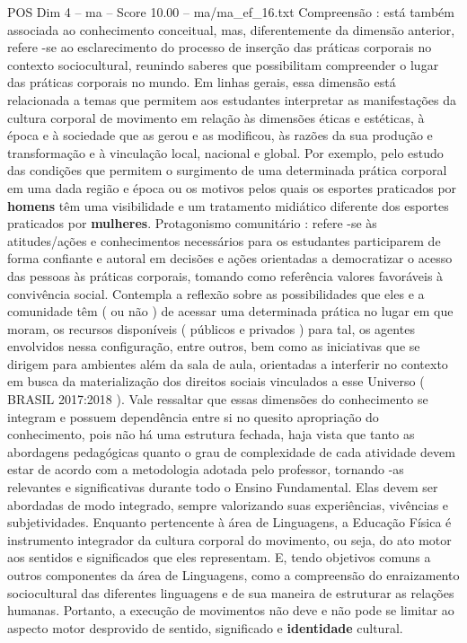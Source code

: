 \begin{textsample}{POS Dim 4 – ma – Score 10.00 – ma/ma\_ef\_16.txt}
Compreensão : está também associada ao conhecimento conceitual, mas, diferentemente da dimensão anterior, refere -se ao esclarecimento do processo de inserção das práticas corporais no contexto sociocultural, reunindo saberes que possibilitam compreender o lugar das práticas corporais no mundo.
Em linhas gerais, essa dimensão está relacionada a temas que permitem aos estudantes interpretar as manifestações da cultura corporal de movimento em relação às dimensões éticas e estéticas, à época e à sociedade que as gerou e as modificou, às razões da sua produção e transformação e à vinculação local, nacional e global.
Por exemplo, pelo estudo das condições que permitem o surgimento de uma determinada prática corporal em uma dada região e época ou os motivos pelos quais os esportes praticados por \textbf{homens} têm uma visibilidade e um tratamento midiático diferente dos esportes praticados por \textbf{mulheres}.
Protagonismo comunitário : refere -se às atitudes/ações e conhecimentos necessários para os estudantes participarem de forma confiante e autoral em decisões e ações orientadas a democratizar o acesso das pessoas às práticas corporais, tomando como referência valores favoráveis à convivência social.
Contempla a reflexão sobre as possibilidades que eles e a comunidade têm ( ou não ) de acessar uma determinada prática no lugar em que moram, os recursos disponíveis ( públicos e privados ) para tal, os agentes envolvidos nessa configuração, entre outros, bem como as iniciativas que se dirigem para ambientes além da sala de aula, orientadas a interferir no contexto em busca da materialização dos direitos sociais vinculados a esse Universo ( BRASIL 2017:2018 ).
Vale ressaltar que essas dimensões do conhecimento se integram e possuem dependência entre si no quesito apropriação do conhecimento, pois não há uma estrutura fechada, haja vista que tanto as abordagens pedagógicas quanto o grau de complexidade de cada atividade devem estar de acordo com a metodologia adotada pelo professor, tornando -as relevantes e significativas durante todo o Ensino Fundamental.
Elas devem ser abordadas de modo integrado, sempre valorizando suas experiências, vivências e subjetividades.
Enquanto pertencente à área de Linguagens, a Educação Física é instrumento integrador da cultura corporal do movimento, ou seja, do ato motor aos sentidos e significados que eles representam.
E, tendo objetivos comuns a outros componentes da área de Linguagens, como a compreensão do enraizamento sociocultural das diferentes linguagens e de sua maneira de estruturar as relações humanas.
Portanto, a execução de movimentos não deve e não pode se limitar ao aspecto motor desprovido de sentido, significado e \textbf{identidade} cultural.

\end{textsample}
